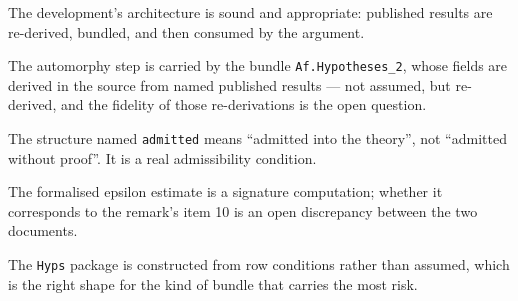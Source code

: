\begin{keytakeaways}

\item The development's architecture is sound and appropriate: published
results are re-derived, bundled, and then consumed by the argument.
\item The automorphy step is carried by the bundle
\texttt{Af.Hypotheses\_2}, whose fields are derived in the source from named
published results --- not assumed, but re-derived, and the fidelity of those
re-derivations is the open question.
\item The structure named \texttt{admitted} means ``admitted into the
theory'', not ``admitted without proof''. It is a real admissibility
condition.
\item The formalised epsilon estimate is a signature computation; whether it
corresponds to the remark's item 10 is an open discrepancy between the two
documents.
\item The \texttt{Hyps} package is constructed from row conditions rather
than assumed, which is the right shape for the kind of bundle that carries
the most risk.
\end{keytakeaways}
